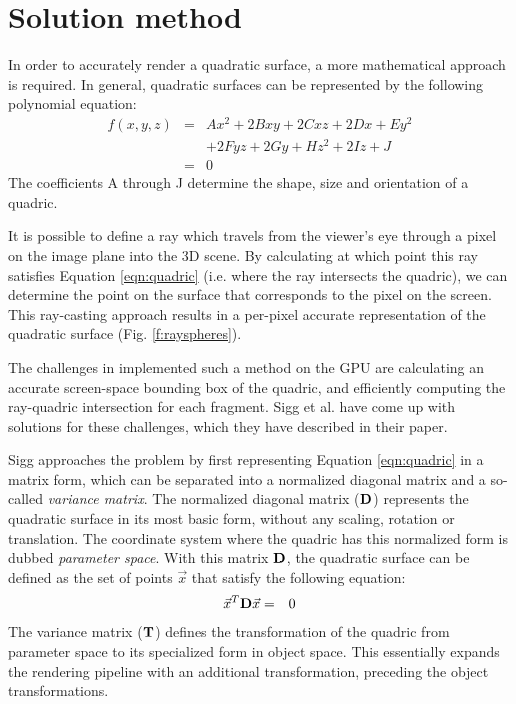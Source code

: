 \section{Solution method}
In order to accurately render a quadratic surface, a more mathematical approach is required.
In general, quadratic surfaces can be represented by the following polynomial equation:
\begin{eqnarray}
\label{eqn:quadric} f(x,y,z) & = & Ax^2 + 2Bxy + 2Cxz + 2Dx + Ey^2\\
\nonumber & & + 2Fyz + 2Gy + Hz^2 + 2Iz + J\\
\nonumber & = & 0
\end{eqnarray}
The coefficients A through J determine the shape, size and orientation of a quadric.

It is possible to define a ray which travels from the viewer's eye through a pixel on the image plane into the 3D scene.
By calculating at which point this ray satisfies Equation \ref{eqn:quadric} (i.e. where the ray intersects the quadric), we can
determine the point on the surface that corresponds to the pixel on the screen. 
This ray-casting approach results in a per-pixel accurate representation of the quadratic surface (Fig. \ref{f:rayspheres}).

The challenges in implemented such a method on the GPU are calculating an accurate screen-space bounding box of the quadric,
and efficiently computing the ray-quadric intersection for each fragment. 
Sigg et al. have come up with solutions for these challenges, which they have described in their paper.

Sigg approaches the problem by first representing Equation \ref{eqn:quadric} in a matrix form, which can be separated into a normalized diagonal matrix
and a so-called {\em variance matrix}.
The normalized diagonal matrix (${\bf D}$) represents the quadratic surface in its most basic form, without any scaling, rotation or translation.
The coordinate system where the quadric has this normalized form is dubbed {\em parameter space}.
With this matrix ${\bf D}$, the quadratic surface can be defined as the set of points $\vec{x}$ that satisfy the following equation:
\begin{eqnarray}
\label{eqn:diag} \vec{x}^T {\bf D} \vec{x} & = & 0
\end{eqnarray}
The variance matrix (${\bf T}$) defines the transformation of the quadric from parameter space to its specialized form in object space.
This essentially expands the rendering pipeline with an additional transformation, preceding the object transformations.

